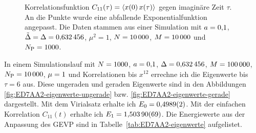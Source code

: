 \begin{figure}[htbp]
    \centering
    \caption{%
        Korrelationsfunktion $C_{11}(\tau) = \langle x(0) \, x(\tau) \rangle$ gegen
        imaginäre Zeit $\tau$. An die Punkte wurde eine abfallende
        Exponentialfunktion angepasst. Die Daten stammen aus einer Simulation
        mit $a = \num{0.1}$, $\tilde \Delta = \Delta =
        \num{0.632456}$, $\mu^2 = \num{1}$, $N = \num{10000}$,
        $M = \num{10000}$ und $N_\text P = \num{1000}$.
    }
    \label{fig:84DAA2-correlation}
\end{figure}

In einem Simulationslauf mit $N = \num{1000}$, $a =
\num{0.1}$, $\Delta = \num{0.632456}$, $M = \num{100000}$,
$N_\text P = \num{10000}$, $\mu = \num{1}$ und Korrelationen bis
$x^{12}$ errechne ich die Eigenwerte bis $\tau = \num{6}$ aus. Diese ungeraden
und geraden Eigenwerte sind in den Abbildungen
\ref{fig:ED7AA2-eigenwerte-ungerade} bzw. \ref{fig:ED7AA2-eigenwerte-gerade}
dargestellt. Mit dem Virialsatz erhalte ich $E_0 = \num{0.4989 +- 0.0002}$. Mit
der einfachen Korrelation $C_{11}(t)$ erhalte ich $E_1 = \num{1.50390 +- 0.00069}$. Die Energiewerte aus der Anpassung des GEVP sind in
Tabelle~\ref{tab:ED7AA2-eigenwerte} aufgelistet.

